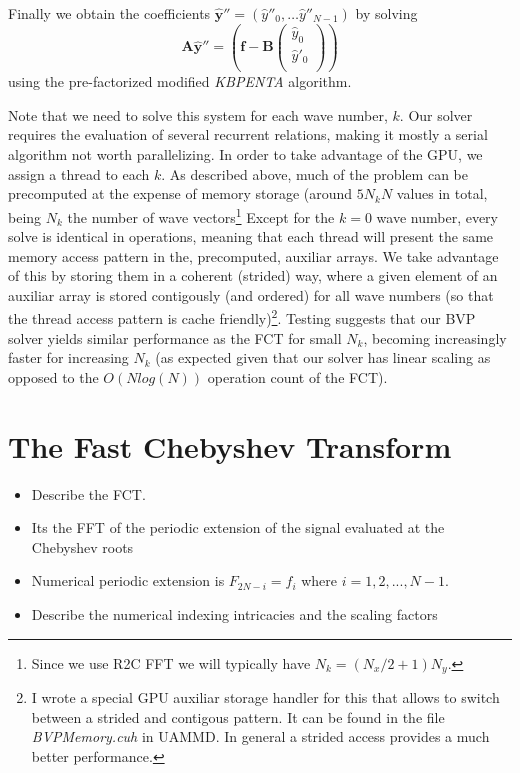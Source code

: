 \documentclass[ twoside,openright,titlepage,numbers=noenddot,%
headinclude,footinclude,cleardoublepage=empty,abstract=on,
BCOR=5mm,paper=a4,fontsize=11pt, dvipsnames
]{scrreprt}
\newcommand{\uammd}{\gls{UAMMD}\xspace}
\newcommand{\gpu}{\gls{GPU}\xspace}
\newcommand{\fou}[1]{\widehat{#1}}
\begin{document}
Finally we obtain the coefficients $\fou{\bm{y}}''=(\fou{y}''_0, \dots \fou{y}''_{N-1})$ by solving
\begin{equation}
\bm{A}\fou{\bm{y}}''=\left(\bm{f}-\bm{B}\begin{pmatrix}   \fou{y}_0 \\ \fou{y}'_0\\ \end{pmatrix}\right)
\end{equation}
using the pre-factorized modified \emph{KBPENTA} algorithm.

Note that we need to solve this system for each wave number, $k$. Our solver requires the evaluation of several recurrent relations, making it mostly a serial algorithm not worth parallelizing. In order to take advantage of the \gpu, we assign a thread to each $k$. As described above, much of the problem can be precomputed at the expense of memory storage (around $5N_kN$ values in total, being $N_k$ the number of wave vectors\footnote{Since we use R2C \gls{FFT} we will typically have $N_k=(N_x/2+1)N_y$.}
Except for the $k=0$ wave number, every solve is identical in operations, meaning that each thread will present the same memory access pattern in the, precomputed, auxiliar arrays. We take advantage of this by storing them in a coherent (strided) way, where a given element of an auxiliar array is stored contigously (and ordered) for all wave numbers (so that the thread access pattern is cache friendly)\footnote{I wrote a special \gpu auxiliar storage handler for this that allows to switch between a strided and contigous pattern. It can be found in the file \emph{BVPMemory.cuh} in \uammd. In general a strided access provides a much better performance.}. Testing suggests that our \gls{BVP} solver yields similar performance as the \gls{FCT} for small $N_k$, becoming increasingly faster for increasing $N_k$ (as expected given that our solver has linear scaling as opposed to the $O(Nlog(N))$ operation count of the \gls{FCT}).

\chapter{The Fast Chebyshev Transform}\label{sec:fct}

\begin{itemize}
\item Describe the FCT.
\item Its the FFT of the periodic extension of the signal evaluated at the Chebyshev roots
\item Numerical periodic extension is $F_{2N-i} = f_i$ where $i=1,2,...,N-1$.
\item Describe the numerical indexing intricacies and the scaling factors
\end{itemize}
\end{document}
